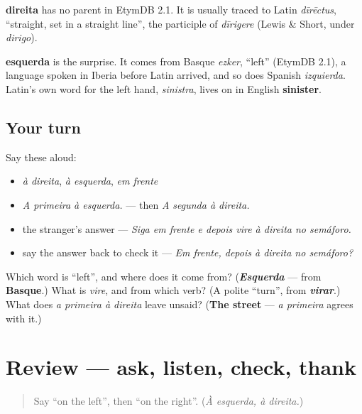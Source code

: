 \begin{cousinweb}
\textbf{direita} has no parent in EtymDB 2.1. It is usually traced to Latin \emph{dīrēctus}, \textquotedblleft{}straight, set in a straight line\textquotedblright{}, the participle of \emph{dīrigere} (Lewis \& Short, under \emph{dirigo}).

\textbf{esquerda} is the surprise. It comes from Basque \emph{ezker}, \textquotedblleft{}left\textquotedblright{} (EtymDB 2.1), a language spoken in Iberia before Latin arrived, and so does Spanish \emph{izquierda}. Latin's own word for the left hand, \emph{sinistra}, lives on in English \textbf{sinister}.
\end{cousinweb}

\subsection*{Your turn}
Say these aloud:

\begin{itemize}
\raggedright
  \item \emph{à direita}, \emph{à esquerda}, \emph{em frente}
  \item \emph{A primeira à esquerda.} — then \emph{A segunda à direita.}
  \item the stranger's answer — \emph{Siga em frente e depois vire à direita no semáforo.}
  \item say the answer back to check it — \emph{Em frente, depois à direita no semáforo?}
\end{itemize}

\begin{tcolorbox}[breakable,colback=teal!4,colframe=teal!35!black,title={Before you move on}]
Which word is \textquotedblleft{}left\textquotedblright{}, and where does it come from? (\emph{\textbf{Esquerda}} — from \textbf{Basque}.) What is \emph{vire}, and from which verb? (A polite \textquotedblleft{}turn\textquotedblright{}, from \emph{\textbf{virar}}.) What does \emph{a primeira à direita} leave unsaid? (\textbf{The street} — \emph{a primeira} agrees with it.)
\end{tcolorbox}
\section[(review)]{Review — ask, listen, check, thank}

\label{lesson:PT-C263-revisao-caminho}



\begin{quote}
Say \textquotedblleft{}on the left\textquotedblright{}, then \textquotedblleft{}on the right\textquotedblright{}. (\emph{À esquerda, à direita.})
\end{quote}

